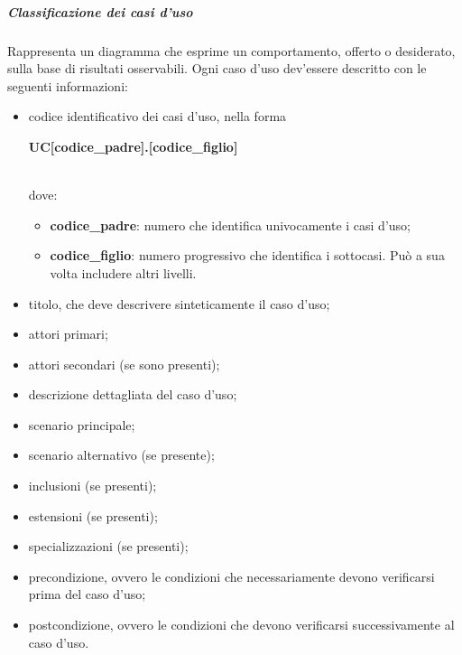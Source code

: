 			\subparagraph{Classificazione dei casi d'uso}
			Rappresenta un diagramma che esprime un comportamento,
			offerto o desiderato, sulla base di risultati osservabili.
			Ogni caso d'uso dev'essere descritto con le seguenti informazioni:
			\begin{itemize}
				\item codice identificativo dei casi d'uso, nella forma \newline \newline
						\centerline{\textbf{UC[codice\_padre].[codice\_figlio]}} \\
						dove:
					\begin{itemize}
							\item \textbf{codice\_padre}: numero che identifica univocamente i casi d'uso;
							\item \textbf{codice\_figlio}: numero progressivo che identifica i sottocasi. Può a sua volta includere altri livelli. \\
					\end{itemize}
				\item titolo, che deve descrivere sinteticamente il caso d'uso;
				\item attori primari;
				\item attori secondari (se sono presenti);
				\item descrizione dettagliata del caso d'uso;
				\item scenario principale;
				\item scenario alternativo (se presente);
				\item inclusioni (se presenti);
				\item estensioni (se presenti);
				\item specializzazioni (se presenti);
				\item precondizione, ovvero le condizioni che necessariamente devono verificarsi prima del caso d'uso;
				\item postcondizione, ovvero le condizioni che devono verificarsi successivamente al caso d'uso. \\
			\end{itemize}
			\noindent
			
